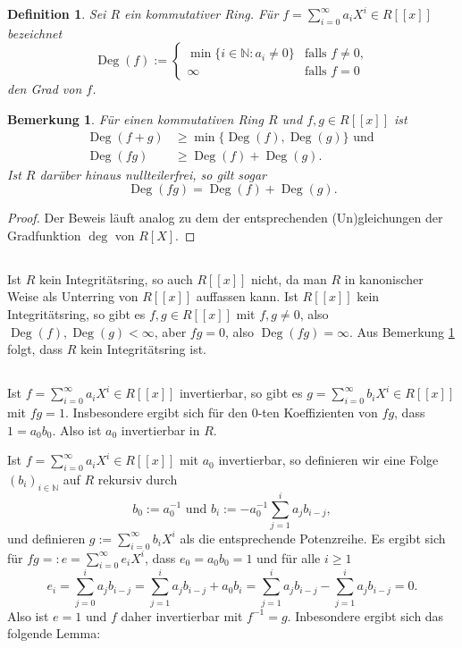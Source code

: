 \documentclass[a4paper,10pt]{article}
\newcounter{satze}
\newtheorem{bem}[satze]{Bemerkung}
\newtheorem*{defi}{Definition}
\theoremstyle{definition}
\newcommand{\N}{\mathbb{N}}
\newcommand{\Deg}{\operatorname{Deg}}
\begin{document}
\begin{defi}
Sei $R$ ein kommutativer Ring. Für $f = \sum_{i=0}^\infty a_i X^i \in R[\![x]\!]$ bezeichnet
\[
 \Deg(f) :=
 \begin{cases}
  \min \{i \in \N : a_i \neq 0\} & \text{falls } f \neq 0, \\
                          \infty & \text{falls } f = 0
 \end{cases}
\]
den \emph{Grad} von $f$.
\end{defi}
\begin{bem}\label{bem: grad potenzreihe}
 Für einen kommutativen Ring $R$ und $f,g \in R[\![x]\!]$ ist
 \begin{align*}
  \Deg(f+g) &\geq \min \{\Deg(f), \Deg(g)\} \text{ und } \\
  \Deg(fg)  &\geq \Deg(f) + \Deg(g).
 \end{align*}
 Ist $R$ darüber hinaus nullteilerfrei, so gilt sogar
 \begin{equation*}
  \Deg(fg) = \Deg(f) + \Deg(g).
 \end{equation*}
\end{bem}
\begin{proof}
 Der Beweis läuft analog zu dem der entsprechenden (Un)gleichungen der Gradfunktion $\deg$ von $R[X]$.
\end{proof}



\subsection{}
Ist $R$ kein Integritätsring, so auch $R[\![x]\!]$ nicht, da man $R$ in kanonischer Weise als Unterring von $R[\![x]\!]$ auffassen kann. Ist $R[\![x]\!]$ kein Integritätsring, so gibt es $f, g \in R[\![x]\!]$ mit $f,g \neq 0$, also $\Deg(f), \Deg(g) < \infty$, aber $fg = 0$, also $\Deg(fg) = \infty$. Aus Bemerkung \ref{bem: grad potenzreihe} folgt, dass $R$ kein Integritätsring ist.


\subsection{}
Ist $f = \sum_{i=0}^\infty a_i X^i \in R[\![x]\!]$ invertierbar, so gibt es $g = \sum_{i=0}^\infty b_i X^i \in R[\![x]\!]$ mit $fg = 1$. Insbesondere ergibt sich für den $0$-ten Koeffizienten von $fg$, dass $1 = a_0 b_0$. Also ist $a_0$ invertierbar in $R$.

Ist $f = \sum_{i=0}^\infty a_i X^i \in R[\![x]\!]$ mit $a_0$ invertierbar, so definieren wir eine Folge $(b_i)_{i \in \N}$ auf $R$ rekursiv durch
\[
 b_0 := a_0^{-1} \text{ und } b_i := -a_0^{-1} \sum_{j=1}^i a_j b_{i-j},
\]
und definieren $g := \sum_{i=0}^\infty b_i X^i$ als die entsprechende Potenzreihe. Es ergibt sich für \mbox{$fg =: e = \sum_{i=0}^\infty e_i X^i$}, dass $e_0 = a_0 b_0 = 1$ und für alle $i \geq 1$
\[
 e_i
 = \sum_{j=0}^i a_j b_{i-j}
 = \sum_{j=1}^i a_j b_{i-j} + a_0 b_i
 = \sum_{j=1}^i a_j b_{i-j} - \sum_{j=1}^i a_j b_{i-j}
 = 0.
\]
Also ist $e = 1$ und $f$ daher invertierbar mit $f^{-1} = g$. Inbesondere ergibt sich das folgende Lemma:
\end{document}
